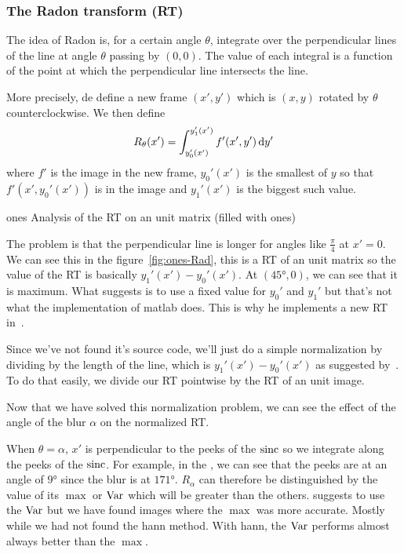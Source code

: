 \subsubsection{The Radon transform (RT)}
\label{sec:rt}
The idea of Radon is, for a certain angle $\theta$,
integrate over the perpendicular lines of the line at
angle $\theta$ passing by $(0,0)$.
The value of each integral is a function of the
point at which the perpendicular line intersects the
line.

More precisely, de define a new frame $(x',y')$
which is $(x,y)$ rotated by $\theta$ counterclockwise.
We then define
\[ R_\theta(x') = \int_{y_0'(x')}^{y_1'(x')} f'(x',y') \operatorname{d}\! y' \]
where $f'$ is the image in the new frame,
$y_0'(x')$ is the smallest of $y$ so that $f'(x',y_0'(x'))$ is in the image
and $y_1'(x')$ is the biggest such value.

\begin{myfig}{ones}
  {Analysis of the RT on an unit matrix (filled with ones)}
\end{myfig}

The problem is that the perpendicular line is longer for angles
like $\frac{\pi}{4}$ at $x' = 0$.
We can see this in the figure~\ref{fig:ones-Rad},
this is a RT of an unit matrix so the value of the RT is
basically $y_1'(x') - y_0'(x')$.
At $(\ang{45},0)$, we can see that it is maximum.
What \cite{oliveira2007blind} suggests is to use a fixed
value for $y_0'$ and $y_1'$ but that's not
what the implementation of matlab does.
This is why he implements a new RT in~\cite{oliveira2006implementation}.

Since we've not found it's source code,
we'll just do a simple normalization
by dividing by the length of the line,
which is $y_1'(x') - y_0'(x')$ as
suggested by~\cite{krahmer2006blind}.
To do that easily,
we divide our RT pointwise by the
RT of an unit image.

Now that we have solved this normalization problem,
we can see the effect of the angle of the blur $\alpha$
on the normalized RT.

When $\theta = \alpha$,
$x'$ is perpendicular to the peeks of the $\operatorname{sinc}$ so
we integrate along the peeks of the $\operatorname{sinc}$.
For example, in the , we can see
that the peeks are at an angle of $\ang{9}$ since the
blur is at $\ang{171}$.
$R_\alpha$ can therefore be distinguished by the value
of its $\max$ or $\operatorname{Var}$ which will be greater than the
others.
\cite{oliveira2007blind} suggests to use the $\operatorname{Var}$
but we have found images where the $\max$ was more
accurate.
Mostly while we had not found the hann method.
With hann, the $\operatorname{Var}$ performs almost always
better than the $\max$.

